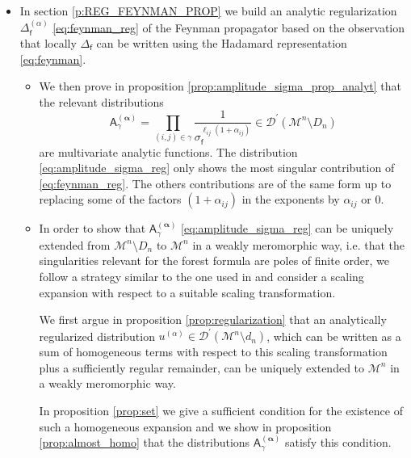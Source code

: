 \documentclass[11pt]{book}
\newcommand{\alphabd}{\boldsymbol{\alpha}}
\newcommand{\Dcal}{\mathcal{D}}
\newcommand{\Mcal}{\mathcal{M}}
\newcommand{\Asf}{\mathsf{A}}
\newcommand{\fsf}{\mathsf{f}}
\theoremstyle{break}
\begin{document}
\begin{itemize}


\item In section \ref{p:REG_FEYNMAN_PROP} we build an analytic regularization $\Delta^{(\alpha)}_\fsf$ \eqref{eq:feynman_reg} of the Feynman propagator based on the observation that locally $\Delta_\fsf$ can be written using the Hadamard representation \eqref{eq:feynman}. 

\begin{itemize}


\item We then prove in proposition \ref{prop:amplitude_sigma_prop_analyt} that the relevant distributions 
%
\begin{equation}
\Asf_\gamma^{(\alphabd)} = \prod_{(i,j)\in\gamma} \frac{1}{\sigma_\fsf^{\ell_{ij}(1+\alpha_{ij})}} \in \Dcal^\prime(\Mcal^n\setminus D_n)
\label{eq:amplitude_sigma_reg}
\end{equation}
\index{$\Asf_\gamma^{(\alphabd)}$}%
%
are multivariate analytic functions. The distribution \eqref{eq:amplitude_sigma_reg} only shows the most singular contribution of \eqref{eq:feynman_reg}. The others contributions are of the same form up to replacing some of the factors $(1+\alpha_{ij})$ in the exponents by $\alpha_{ij}$ or $0$.


\item In order to show that $\Asf_\gamma^{(\alphabd)}$ \eqref{eq:amplitude_sigma_reg} can be uniquely extended from $\Mcal^n\setminus D_n$ to $\Mcal^n$ in a weakly meromorphic way, i.e. that the singularities relevant for the forest formula are poles of finite order, we follow a strategy similar to the one used in \cite{hollands_local_2001} and consider a scaling expansion with respect to a suitable scaling transformation. 

We first argue in proposition \ref{prop:regularization} that an analytically regularized distribution $u^{(\alpha)}\in\Dcal^\prime(\Mcal^n\setminus d_n)$, which can be written as a sum of homogeneous terms with respect to this scaling transformation plus a sufficiently regular remainder, can be uniquely extended to $\Mcal^n$ in a weakly meromorphic way.

In proposition \ref{prop:set} we give a sufficient condition for the existence of such a homogeneous expansion and we show in proposition \ref{prop:almost_homo} that the distributions $\Asf_\gamma^{(\alphabd)}$ satisfy this condition.

\end{itemize}



\end{itemize}
\end{document}
